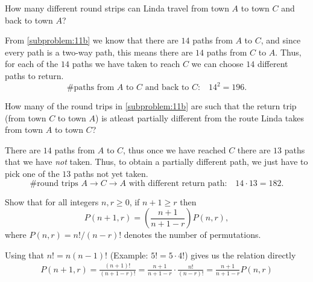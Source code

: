 \documentclass[a4paper, english, 12pt]{article} %
\begin{document}
\begin{subproblem}
  \label{subproblem:11b}
  How many different round strips can Linda travel from town $A$ to town $C$ and
  back to town $A$?
\end{subproblem}

\begin{answer}
  From \cref{subproblem:11b} we know that there are $14$ paths from $A$ to $C$,
  and since every path is a two-way path, this means there are $14$ paths from
  $C$ to $A$. Thus, for each of the $14$ paths we have taken to reach $C$ we can
  choose $14$ different paths to return. 
  \begin{equation*}
    \text{\# paths from $A$ to $C$ and back to $C$:} \quad 14^2 = 196.
  \end{equation*}
\end{answer}

\begin{subproblem}
  How many of the round trips in \cref{subproblem:11b} are such that the return
  trip (from town $C$ to town $A$) is atleast partially different from the route
  Linda takes from town $A$ to town $C$?
\end{subproblem}

\begin{answer}
  There are $14$ paths from $A$ to $C$, thus once we have reached $C$ there are
  $13$ paths that we have \emph{not} taken. Thus, to obtain a partially
  different path, we just have to pick one of the $13$ paths not yet taken.
  \begin{equation*}
    \text{\# round trips $A \to C \to A$ with different return path:} \quad 14 \cdot 13 = 182.
  \end{equation*}
\end{answer}

\begin{problem}[24]
  Show that for all integers $n, r \geq 0$, if $n + 1 \geq r$ then
  \begin{equation*}
    P(n + 1, r) = \left( \frac{n + 1}{n + 1 - r} \right) P(n, r),
  \end{equation*}
  where $P(n, r) = n!/(n - r)!$ denotes the number of permutations.
\end{problem}

\begin{answer}
  Using that $n! = n(n-1)!$ (Example: $5! = 5\cdot 4!$) gives us the relation directly
  \begin{align*}
    P(n + 1, r)
    = \frac{(n+1)!}{(n+1-r)!}
    = \frac{n+1}{n+1-r} \cdot \frac{n!}{(n-r)!}
    = \frac{n+1}{n+1-r} P(n, r)
  \end{align*}
\end{answer}
\end{document}

